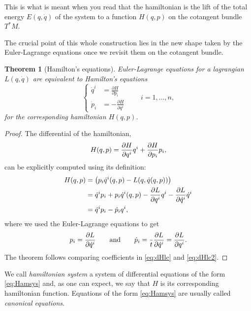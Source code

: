 \documentclass[english,fontsize=11pt,paper=a5,oneside]{scrbook}
\let\d\relax
\newcommand{\d}{\mathrm{d}}
\newtheorem{theorem}{Theorem}[chapter]
\theoremstyle{definition}
\newenvironment{remark}
  {\pushQED{\qed}\renewcommand{\qedsymbol}{$\lozenge$}\remarkx}
  {\popQED\endremarkx}
\begin{document}
\begin{remark}
  This is what is meant when you read that the hamiltonian is the lift of the total energy $E(q, \dot q)$ of the system to a function $H(q,p)$ on the cotangent bundle $T^*M$.
\end{remark}

The crucial point of this whole construction lies in the new shape taken by the Euler-Lagrange equations once we revisit them on the cotangent bundle.

\begin{theorem}[Hamilton's equations]\label{thm:Hameqns}
  Euler-Lagrange equations for a lagrangian $L(q,\dot q)$ are equivalent to \emph{Hamilton's equations}
  \begin{equation}\label{eq:Hamsys}
    \left\lbrace
    \begin{aligned}
      \dot q^i & = \frac{\partial H}{\partial p_i}  \\
      \dot p_i & = -\frac{\partial H}{\partial q^i}
    \end{aligned}
    \right. \qquad i=1,\ldots,n,
  \end{equation}
  for the corresponding hamiltonian $H(q,p)$.
\end{theorem}
\begin{proof}
  The differential of the hamiltonian,
  \begin{equation}\label{eq:dHlc}
    \d H(q,p) = \frac{\partial H}{\partial q^i}\d q^i + \frac{\partial H}{\partial p_i}\d p_i,
  \end{equation}
  can be explicitly computed using its definition:
  \begin{align}
    \d H(q,p) & = \d \left( p_i\dot q^i(q,p) - L(q, \dot q(q,p)) \right)                                                                             \\
              & = \dot q^i \d p_i + p_i \d \dot q^i(q,p) - \frac{\partial L}{\partial q^i} \d q^i - \frac{\partial L}{\partial \dot q^i} \d \dot q^i \\
              & = \dot q^i \d p_i - \dot p_i \d q^i, \label{eq:dHlc2}
  \end{align}
  where we used the Euler-Lagrange equations to get
  \begin{equation}
    p_i = \frac{\partial L}{\partial \dot q^i}
    \qquad\mbox{and}\qquad
    \dot p_i = \frac{\d }{\d t}\frac{\partial L}{\partial \dot q^i} = \frac{\partial L}{\partial q^i}.
  \end{equation}
  The theorem follows comparing coefficients in \eqref{eq:dHlc} and \eqref{eq:dHlc2}.
\end{proof}
We call \emph{hamiltonian system} a system of differential equations of the form \eqref{eq:Hamsys} and, as one can expect, we say that $H$ is its corresponding hamiltonian function. Equations of the form \eqref{eq:Hamsys} are usually called \emph{canonical equations}.
\end{document}
